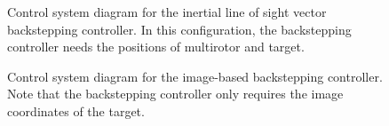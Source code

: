 \begin{figure}[htbp]
	\centering
	\caption[Control system diagram for the inertial line of sight vector backstepping controller.]{Control system diagram for the inertial line of sight vector backstepping controller. In this configuration, the backstepping controller needs the positions of multirotor and target.}
	\label{system_inertial}
\end{figure}

\begin{figure}[htbp]
	\centering
	\caption[Control system diagram for the image-based backstepping controller.]{Control system diagram for the image-based backstepping controller. Note that the backstepping controller only requires the image coordinates of the target.}
	\label{system_image}
\end{figure}


